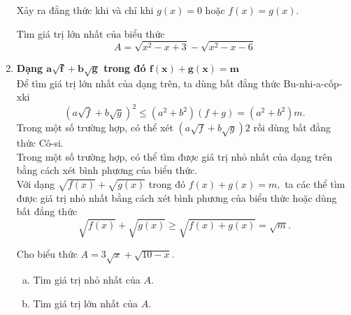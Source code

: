 \begin{enumerate}[1.]
 		Xảy ra đẳng thức khi và chỉ khi $g(x)=0$ hoặc $f(x)=g(x).$
 		\begin{vd}
 			Tìm giá trị lớn nhất của biểu thức \[A=\sqrt{x^2-x+3}-\sqrt{x^2-x-6} \]
 		\end{vd}
 		\item \textbf{Dạng $\mathbf{a \sqrt{f}+b \sqrt{g}}$ trong đó $\mathbf{f(x)+g(x)=m}$}\\
 		Để tìm giá trị lớn nhất của dạng trên, ta dùng bất đẳng thức Bu-nhi-a-cốp-xki \[(a \sqrt{f}+b \sqrt{g})^2 \leq (a^2+b^2)(f+g) =(a^2 +b^2)m. \]
 		Trong một số trường hợp, có thể xét $(a \sqrt{f}+b \sqrt{g}){2}$ rồi dùng bất đẳng thức Cô-si.\\
 		Trong một số trường hợp, có thể tìm được giá trị nhỏ nhất của dạng  trên bằng cách xét bình phương của biểu thức.\\
 		Với dạng $\sqrt{f(x)}+\sqrt{g(x)}$ trong đó $f(x)+g(x)=m,$ ta các thể tìm được giá trị nhỏ nhất bằng cách xét bình phương của biểu thức hoặc dùng bất đẳng thức \[\sqrt{f(x)}+\sqrt{g(x)} \geq \sqrt{f(x)+g(x)}=\sqrt{m}.\]
 		\begin{vd}
 			Cho biểu thức $A=3 \sqrt{x}+\sqrt{10-x}.$
 			\begin{enumerate}[a)]
 				\item Tìm giá trị nhỏ nhất của $A.$
 				\item Tìm giá trị lớn nhất của $A.$
 			\end{enumerate}
\end{vd}
\end{enumerate}
